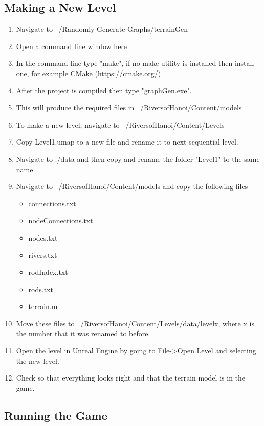 \begin{appendices}
\subsection{Making a New Level}

\begin{enumerate}
	\item Navigate to ~/Randomly Generate Graphs/terrainGen
	\item Open a command line window here
	\item In the command line type "make", if no make utility is installed then install one, for example CMake (https://cmake.org/)
	\item After the project is compiled then type "graphGen.exe".
	\item This will produce the required files in ~/RiversofHanoi/Content/models
	\item To make a new level, navigate to ~/RiversofHanoi/Content/Levels
	\item Copy Level1.umap to a new file and rename it to next sequential level.
	\item Navigate to ./data and then copy and rename the folder "Level1" to the same name.
	\item Navigate to ~/RiversofHanoi/Content/models and copy the following files
	\begin{itemize}
		\item connections.txt
		\item nodeConnections.txt
		\item nodes.txt
		\item rivers.txt
		\item rodIndex.txt
		\item rods.txt
		\item terrain.m
	\end{itemize}
	\item Move these files to ~/RiversofHanoi/Content/Levels/data/levelx, where x is the number that it was renamed to before.
	\item Open the level in Unreal Engine by going to File->Open Level and selecting the new level.
	\item Check so that everything looks right and that the terrain model is in the game.
\end{enumerate}

\subsection{Running the Game}


\end{appendices}
